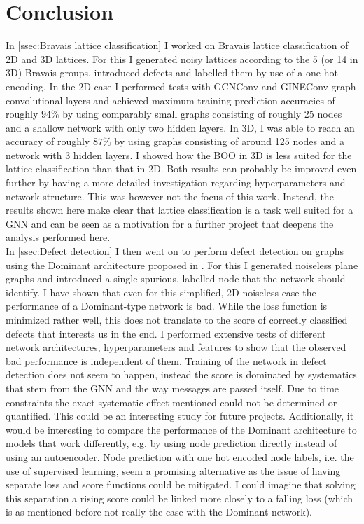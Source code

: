 \documentclass[11pt,a4paper]{article}
\begin{document}
\section{Conclusion}
\label{sec:Conclusion}
In \autoref{ssec:Bravais lattice classification} I worked on Bravais lattice classification of 2D and 3D lattices. 
For this I generated noisy lattices according to the 5 (or 14 in 3D) Bravais groups, introduced defects and labelled them by use of a one hot encoding. 
In the 2D case I performed tests with GCNConv and GINEConv graph convolutional layers and achieved maximum training prediction accuracies of roughly $94\%$ by using comparably small graphs consisting of roughly 25 nodes and a shallow network with only two hidden layers. 
In 3D, I was able to reach an accuracy of roughly $87\%$ by using graphs consisting of around 125 nodes and a network with 3 hidden layers. 
I showed how the BOO in 3D is less suited for the lattice classification than that in 2D. 
Both results can probably be improved even further by having a more detailed investigation regarding hyperparameters and network structure. 
This was however not the focus of this work.
Instead, the results shown here make clear that lattice classification is a task well suited for a GNN and can be seen as a motivation for a further project that deepens the analysis performed here. \\

In \autoref{ssec:Defect detection} I then went on to perform defect detection on graphs using the Dominant architecture proposed in \cite{dingDeepAnomalyDetection2019}. 
For this I generated noiseless plane graphs and introduced a single spurious, labelled node that the network should identify. 
I have shown that even for this simplified, 2D noiseless case the performance of a Dominant-type network is bad. 
While the loss function is minimized rather well, this does not translate to the score of correctly classified defects that interests us in the end. 
I performed extensive tests of different network architectures, hyperparameters and features to show that the observed bad performance is independent of them. 
Training of the network in defect detection does not seem to happen, instead the score is dominated by systematics that stem from the GNN and the way messages are passed itself. 
Due to time constraints the exact systematic effect mentioned could not be determined or quantified. 
This could be an interesting study for future projects. 
Additionally, it would be interesting to compare the performance of the Dominant architecture to models that work differently, e.g. by using node prediction directly instead of using an autoencoder. 
Node prediction with one hot encoded node labels, i.e. the use of supervised learning, seem a promising alternative as the issue of having separate loss and score functions could be mitigated. 
I could imagine that solving this separation a rising score could be linked more closely to a falling loss (which is as mentioned before not really the case with the Dominant network). \\
\end{document}
